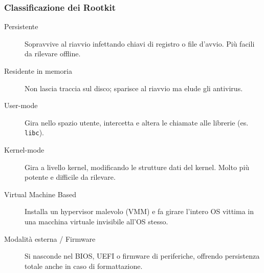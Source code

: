 \subsubsection{Classificazione dei Rootkit}
\begin{description}
    \item[Persistente] Sopravvive al riavvio infettando chiavi di registro o file d'avvio. Più facili da rilevare offline.
    \item[Residente in memoria] Non lascia traccia sul disco; sparisce al riavvio ma elude gli antivirus.
    \item[User-mode] Gira nello spazio utente, intercetta e altera le chiamate alle librerie (es. \texttt{libc}).
    \item[Kernel-mode] Gira a livello kernel, modificando le strutture dati del kernel. Molto più potente e difficile da rilevare.
    \item[Virtual Machine Based] Installa un hypervisor malevolo (VMM) e fa girare l'intero OS vittima in una macchina virtuale invisibile all'OS stesso.
    \item[Modalità esterna / Firmware] Si nasconde nel BIOS, UEFI o firmware di periferiche, offrendo persistenza totale anche in caso di formattazione.
\end{description}
